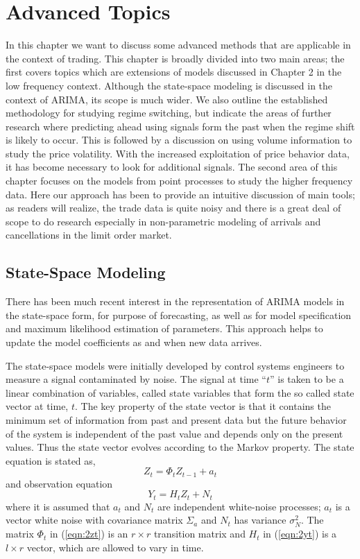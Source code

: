 
\chapter{Advanced Topics}


In this chapter we want to discuss some advanced methods that are applicable in the context of trading. This chapter is broadly divided into two main areas; the first covers topics which are extensions of models discussed in Chapter 2 in the low frequency context. Although the state-space modeling is discussed in the context of ARIMA, its scope is much wider. We also outline the established methodology for studying regime switching, but indicate the areas of further research where predicting ahead using signals form the past when the regime shift is likely to occur. This is followed by a discussion on using volume information to study the price volatility. With the increased exploitation of price behavior data, it has become necessary to look for additional signals. The second area of this chapter focuses on the models from point processes to study the higher frequency data. Here our approach has been to provide an intuitive discussion of main tools; as readers will realize, the trade data is quite noisy and there is a great deal of scope to do research especially in non-parametric modeling of arrivals and cancellations in the limit order market. 


\section{State-Space Modeling} 


There has been much recent interest in the representation of ARIMA models in the state-space form, for purpose of forecasting, as well as for model specification and maximum likelihood estimation of parameters. This approach helps to update the model coefficients as and when new data arrives. 


The state-space models were initially developed by control systems engineers to measure a signal contaminated by noise. The signal at time ``$t$'' is taken to be a linear combination of variables, called state variables that form the so called state vector at time, $t$. The key property of the state vector is that it contains the minimum set of information from past and present data but the future behavior of the system is independent of the past value and depends only on the present values. Thus the state vector evolves according to the Markov property. The state equation is stated as,
	\begin{equation}\label{eqn:2zt}
	Z_t = \Phi_tZ_{t-1} + a_t
	\end{equation}
and observation equation
	\begin{equation}\label{eqn:2yt}
	Y_t = H_tZ_t + N_t
	\end{equation}
where it is assumed that $a_t$ and $N_t$ are independent white-noise processes; $a_t$ is a vector white noise with covariance matrix $\Sigma_a$ and $N_t$ has variance $\sigma_N^2$. The matrix $\Phi_t$ in (\ref{eqn:2zt}) is an $r \times r$ transition matrix and $H_t$ in (\ref{eqn:2yt}) is a $l \times r$ vector, which are allowed to vary in time.


